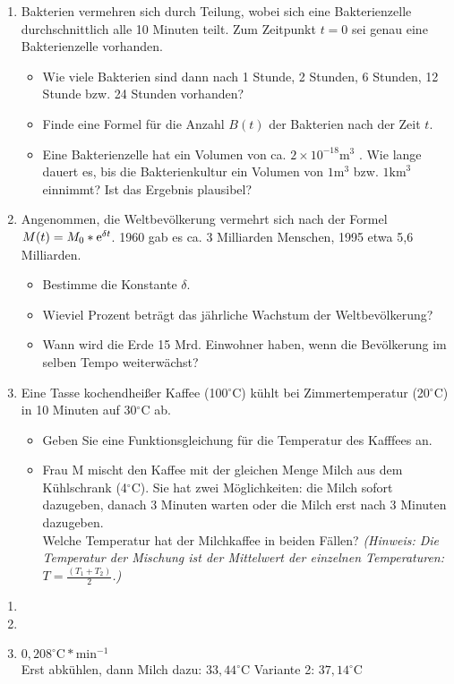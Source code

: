\begin{enumerate}
	\item Bakterien vermehren sich durch Teilung, wobei sich eine Bakterienzelle durchschnittlich alle 10 Minuten teilt. Zum Zeitpunkt $t=0$ sei genau eine Bakterienzelle vorhanden.
	\begin{itemize}
		\item Wie viele Bakterien sind dann nach 1 Stunde, 2 Stunden, 6 Stunden, 12 Stunde bzw. 24 Stunden vorhanden?
		\item Finde eine Formel für die Anzahl $B(t)$ der Bakterien nach der Zeit $t$.
		\item Eine Bakterienzelle hat ein Volumen von ca. $2\times10^{-18}\mathrm{m}^3$ . Wie lange dauert es, bis die Bakterienkultur ein Volumen von $1\mathrm{m}^3$ bzw. $1\mathrm{km}^3$ einnimmt? Ist das Ergebnis plausibel?
	\end{itemize}
	\item	Angenommen, die Weltbevölkerung vermehrt sich nach der Formel $M(t)=M_0*\mathrm{e}^{\delta t}$. 1960 gab es ca. 3 Milliarden Menschen, 1995 etwa 5,6 Milliarden.
	\begin{itemize}
		\item Bestimme die Konstante $\delta$.
		\item Wieviel Prozent beträgt das jährliche Wachstum der Weltbevölkerung?
		\item Wann wird die Erde 15 Mrd. Einwohner haben, wenn die Bevölkerung im selben Tempo weiterwächst?
	\end{itemize}
	\item Eine Tasse kochendheißer Kaffee (100$^\circ$C) kühlt bei Zimmertemperatur (20$^\circ$C) in 10 Minuten auf 30$^\circ$C ab.
	\begin{itemize}
		\item Geben Sie eine Funktionsgleichung für die Temperatur des Kafffees an.
		\item Frau M mischt den Kaffee mit der gleichen Menge Milch aus dem Kühlschrank (4$^\circ$C). Sie hat zwei Möglichkeiten: die Milch sofort dazugeben, danach 3 Minuten warten oder die Milch erst nach 3 Minuten dazugeben.\\
Welche Temperatur hat der Milchkaffee in beiden Fällen?
\textit{(Hinweis: Die Temperatur der Mischung ist der Mittelwert der einzelnen Temperaturen: $T=\frac{(T_1+T_2)}{2}$.)}
	\end{itemize}
\end{enumerate}

\begin{lsg}{}
	\begin{enumerate}
		\item
		\item
		\item $0,208^\circ\mathrm{C} * \mathrm{min}^{-1}$\\
		Erst abkühlen, dann Milch dazu: $33,44^\circ\mathrm{C}$
		Variante 2: $37,14^\circ\mathrm{C}$
	\end{enumerate}
\end{lsg}

